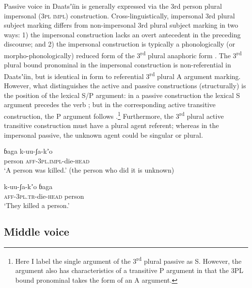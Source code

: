 \documentclass[output=paper]{langsci/langscibook}
\begin{document}
Passive voice in Daatsʼíin is generally expressed via the 3rd person plural impersonal (\textsc{3pl impl}) construction. Cross-linguistically, impersonal 3rd plural subject marking differs from non-impersonal 3rd plural subject marking in two ways: 1) the impersonal construction lacks an overt antecedent in the preceding discourse; and 2) the impersonal construction is typically a phonologically (or morpho-phonologically) reduced form of the 3\textsuperscript{rd} plural anaphoric form \citep[75]{Sieiwerska2010}. The 3\textsuperscript{rd} plural bound pronominal in the impersonal construction is non-referential in Daatsʼíin, but is identical in form to referential 3\textsuperscript{rd} plural A argument marking. However, what distinguishes the active and passive constructions (structurally) is the position of the lexical S/P argument: in a passive construction the lexical S argument precedes the verb ; but in the corresponding active transitive construction, the P argument follows .\footnote{Here I label the single argument of the 3\textsuperscript{rd} plural passive as S. However, the argument also has characteristics of a transitive P argument in that the 3PL bound pronominal takes the form of an A argument. } Furthermore, the 3\textsuperscript{rd} plural active transitive construction must have a plural agent referent; whereas in the impersonal passive, the unknown agent could be singular or plural.

\ea\label{ex:ahlandc:45}
\gll
ɓaga     k-uu-ʃa-kʼo   \\
person   \textsc{aff}\textsc{{}-3pl.impl-}die\textsc{{}-head} \\
\glt
‘A person was killed.’ (the person who did it is unknown)
\z

\ea\label{ex:ahlandc:46}
\gll
k-uu-ʃa-kʼo     ɓaga  \\
\textsc{aff}\textsc{{}-3pl.tr-}die\textsc{{}-head   } person \\
\glt
‘They killed a person.’
\z

\subsection{Middle voice}\label{sec:ahlandc:6.2}
\end{document}
